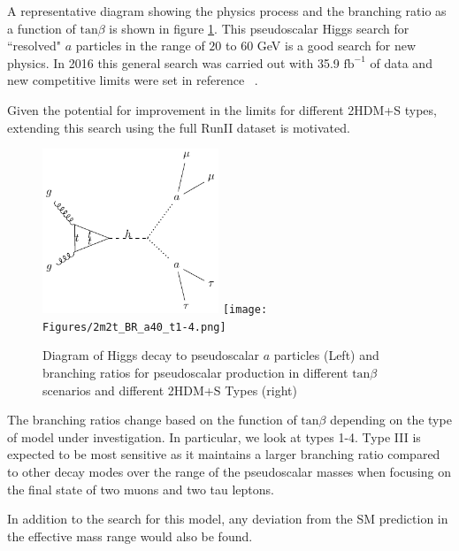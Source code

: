 A representative diagram showing the physics process and the branching ratio as a function of $\text{tan}\beta$ is shown in figure \ref{fig:feynman_haa}. This pseudoscalar Higgs search for ``resolved" $a$ particles in the range of $20$ to $60$ GeV is a good search for new physics.
In 2016 this general search was carried out with 35.9 $\text{fb}^{-1}$ of data and new competitive limits were set in reference ~\cite{CMS-HIG-17-029}.

Given the potential for improvement in the limits for different 2HDM+S types, extending this search using the full RunII dataset is motivated. 


\begin{figure}[ht!b]
  \includegraphics[width=0.47\textwidth]{Figures/feynman_haa.pdf}
  \texttt{[image: Figures/2m2t\_BR\_a40\_t1-4.png]}\\
    \caption{\label{fig:feynman_haa} Diagram of Higgs decay to pseudoscalar $a$ particles (Left) and branching ratios for pseudoscalar production in different $\text{tan}\beta$ scenarios and different 2HDM+S Types (right)}
\end{figure}

The branching ratios change based on the function of $\text{tan}\beta$ depending on the type of model under investigation. In particular, we look at types 1-4. Type III is expected to be most sensitive as it maintains a larger branching ratio compared to other decay modes over the range of the pseudoscalar masses when focusing on the final state of two muons and two tau leptons.



In addition to the search for this model, any deviation from the SM prediction in the effective mass range would also be found.

